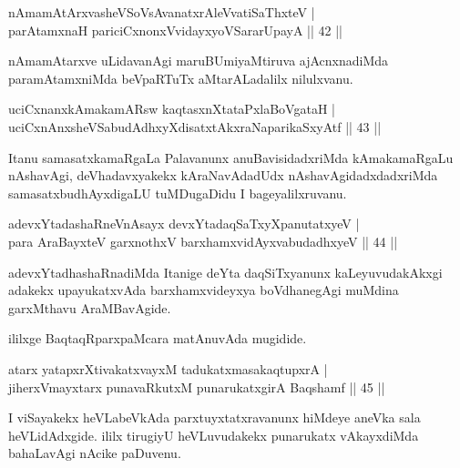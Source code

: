 
\begin{shl}
nAmamAtArxvasheVSoV\s sAvanatxrAleV\s vatiSaThxteV |\\
parAtamxnaH pariciCxnonxV\s vidayxyoVSararUpayA \hfill || 42 ||
\end{shl}

\begin{artha}
nAmamAtarxve uLidavanAgi maruBUmiyaMtiruva ajAcnxnadiMda paramAtamxniMda beVpaRTuTx 
aMtarALadalilx nilulxvanu.
\end{artha}

\begin{shl}
uciCxnanxkAmakamAR\s sw kaqtasxnXtataPxlaBoVgataH |\\
uciCxnAnxsheVSabudAdhxyXdisatxtAkxraNaparikaSxyAtf \hfill || 43 ||
\end{shl}

\begin{artha}
Itanu samasatxkamaRgaLa Palavanunx anuBavisidadxriMda kAmakamaRgaLu nAshavAgi, deVhadavxyakekx kAraNavAdadUdx nAshavAgidadxdadxriMda samasatxbudhAyxdigaLU tuMDugaDidu  I bageyalilxruvanu.
\end{artha}

\begin{shl}
adevxYtadashaRneVnAsayx devxYtadaqSaTxyXpanutatxyeV |\\
para AraBayxteV garxnothxV barxhamxvidAyxvabudadhxyeV \hfill || 44 ||
\end{shl}

\begin{artha}
adevxYtadhashaRnadiMda Itanige deYta daqSiTxyanunx kaLeyuvudakAkxgi adakekx upayukatxvAda barxhamxvideyxya boVdhanegAgi muMdina garxMthavu AraMBavAgide.
\end{artha}

\begin{center}
ililxge BaqtaqRparxpaMcara matAnuvAda mugidide.
\end{center}


\begin{shl}
atarx yatapxrXtivakatxvayxM tadukatxmasakaqtupxrA |\\
jiherxVmayxtarx punavaRkutxM punarukatxgirA Baqshamf \hfill || 45 ||
\end{shl}

\begin{artha}
I viSayakekx heVLabeVkAda parxtuyxtatxravanunx hiMdeye aneVka sala heVLidAdxgide. ililx 
tirugiyU heVLuvudakekx punarukatx vAkayxdiMda bahaLavAgi nAcike paDuvenu.
\end{artha}
	

